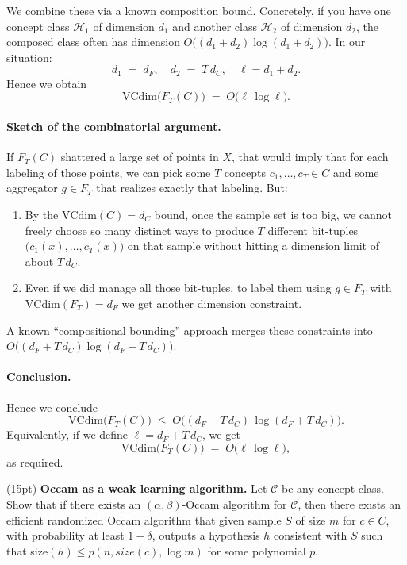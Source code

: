 \documentclass[11pt]{article}
\DeclareMathOperator{\1}{\mathbbm{1}}
\begin{document}
We combine these via a known composition bound. Concretely, if you have one concept class $\mathcal{H}_1$ of dimension $d_1$ and another class $\mathcal{H}_2$ of dimension $d_2$, the composed class often has dimension $O\bigl((d_1 + d_2)\log(d_1 + d_2)\bigr)$.  In our situation:
\[
d_1 \;=\; d_F,\quad d_2 \;=\; T\,d_C,\quad \ell = d_1 + d_2.
\]
Hence we obtain
\[
\mathrm{VCdim}\bigl(F_T(C)\bigr)\;=\;O\bigl(\ell\,\log \ell\bigr).
\]

\paragraph{Sketch of the combinatorial argument.}
If $F_T(C)$ shattered a large set of points in $X$, that would imply that for each labeling of those points, we can pick some $T$ concepts $c_1,\dots,c_T\in C$ and some aggregator $g\in F_T$ that realizes exactly that labeling.  But:
\begin{enumerate}
\item By the $\mathrm{VCdim}(C)=d_C$ bound, once the sample set is too big, we cannot freely choose so many distinct ways to produce $T$ different bit-tuples $\bigl(c_1(x),\dots,c_T(x)\bigr)$ on that sample without hitting a dimension limit of about $T\,d_C$.
\item Even if we did manage all those bit-tuples, to label them using $g\in F_T$ with $\mathrm{VCdim}(F_T)=d_F$ we get another dimension constraint. 
\end{enumerate}
A known ``compositional bounding” approach merges these constraints into $O\bigl((d_F + T\,d_C)\log(d_F + T\,d_C)\bigr)$.

\paragraph{Conclusion.}
Hence we conclude
\[
\mathrm{VCdim}\bigl(F_T(C)\bigr)\;\le\;O\bigl((d_F + T\,d_C)\,\log(d_F + T\,d_C)\bigr).
\]
Equivalently, if we define $\ell = d_F + T\,d_C$, we get
\[
\mathrm{VCdim}\bigl(F_T(C)\bigr)\;=\;O\!\bigl(\ell \,\log \ell\bigr),
\]
as required.

\begin{problem}(15pt) \textbf{Occam as a weak learning algorithm.} Let $\mathcal{C}$ be any concept class. Show that if there exists an $(\alpha, \beta)$-Occam algorithm for $\mathcal{C}$, then there exists an efficient randomized Occam algorithm that given sample $S$ of size $m$ for $c \in C$, with probability at least $1 - \delta$, outputs a hypothesis $h$ consistent with $S$ such that size$(h) \leq p(n,size(c), \log m)$ for some polynomial $p$.
\end{problem}
\end{document}
